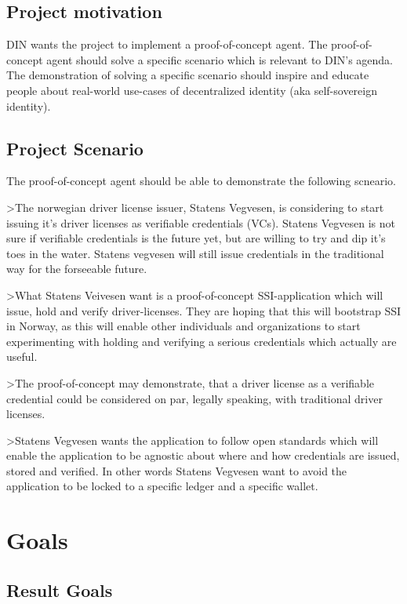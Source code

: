 \subsection{Project motivation}

DIN wants the project to implement a proof-of-concept agent. The proof-of-concept agent should solve a specific scenario which is relevant to DIN's agenda. The demonstration of solving a specific scenario should inspire and educate people about real-world use-cases of decentralized identity (aka self-sovereign identity).

\subsection{Project Scenario}

The proof-of-concept agent should be able to demonstrate the following scneario.

>The norwegian driver license issuer, Statens Vegvesen, is considering to start issuing it's driver licenses as verifiable credentials (VCs). Statens Vegvesen is not sure if verifiable credentials is the future yet, but are willing to try and dip it's toes in the water. Statens vegvesen will still issue credentials in the traditional way for the forseeable future.

>What Statens Veivesen want is a proof-of-concept SSI-application which will issue, hold and verify driver-licenses. They are hoping that this will bootstrap SSI in Norway, as this will enable other individuals and organizations to start experimenting with holding and verifying a serious credentials which actually are useful.

>The proof-of-concept may demonstrate, that a driver license as a verifiable credential could be considered on par, legally speaking, with traditional driver licenses.

>Statens Vegvesen wants the application to follow open standards which will enable the application to be agnostic about where and how credentials are issued, stored and verified. In other words Statens Vegvesen want to avoid the application to be locked to a specific ledger and a specific wallet.


\section{Goals}

\subsection{Result Goals}

